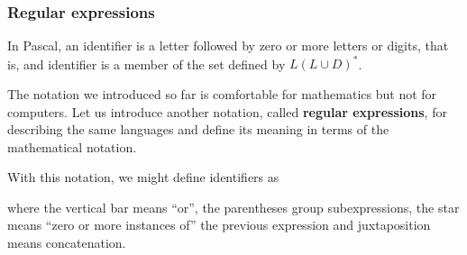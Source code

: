 
% 
\begin{frame}
\frametitle{Regular expressions}

In Pascal, an identifier is a letter followed by zero or more letters
or digits, that is, and identifier is a member of the set defined
by \(L(L \cup D)^{*}\).

\bigskip

The notation we introduced so far is comfortable for mathematics but
not for computers. Let us introduce another notation,
called \textbf{regular expressions}, for describing the same languages
and define its meaning in terms of the mathematical notation.

\bigskip

With this notation, we might define \Pascal identifiers as
\begin{center}
 \lparen{} \disj {}\rparen\kleene
\end{center}
where the vertical bar means ``or'', the parentheses group
subexpressions, the star means ``zero or more instances of'' the
previous expression and juxtaposition means concatenation.

\end{frame}

